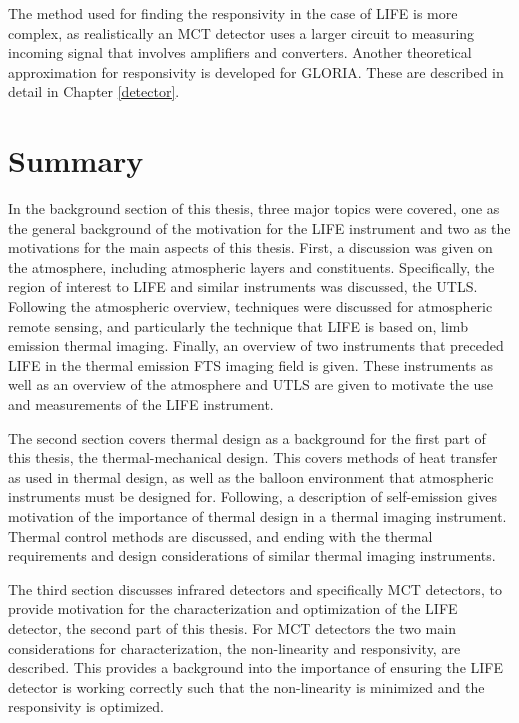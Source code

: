 The method used for finding the responsivity in the case of LIFE is more complex, as realistically an MCT detector uses a larger circuit to measuring incoming signal that involves amplifiers and converters. Another theoretical approximation for responsivity is developed for GLORIA. These are described in detail in Chapter \ref{detector}.


\section {Summary}

In the background section of this thesis, three major topics were covered, one as the general background of the motivation for the LIFE instrument and two as the motivations for the main aspects of this thesis. First, a discussion was given on the atmosphere, including atmospheric layers and constituents. Specifically, the region of interest to LIFE and similar instruments was discussed, the UTLS. Following the atmospheric overview, techniques were discussed for atmospheric remote sensing, and particularly the technique that LIFE is based on, limb emission thermal imaging. Finally, an overview of two instruments that preceded LIFE in the thermal emission FTS imaging field is given. These instruments as well as an overview of the atmosphere and UTLS are given to motivate the use and measurements of the LIFE instrument.

The second section covers thermal design as a background for the first part of this thesis, the thermal-mechanical design. This covers methods of heat transfer as used in thermal design, as well as the balloon environment that atmospheric instruments must be designed for. Following, a description of self-emission gives motivation of the importance of thermal design in a thermal imaging instrument. Thermal control methods are discussed, and ending with the thermal requirements and design considerations of similar thermal imaging instruments.

The third section discusses infrared detectors and specifically MCT detectors, to provide motivation for the characterization and optimization of the LIFE detector, the second part of this thesis. For MCT detectors the two main considerations for characterization, the non-linearity and responsivity, are described. This provides a background into the importance of ensuring the LIFE detector is working correctly such that the non-linearity is minimized and the responsivity is optimized. 